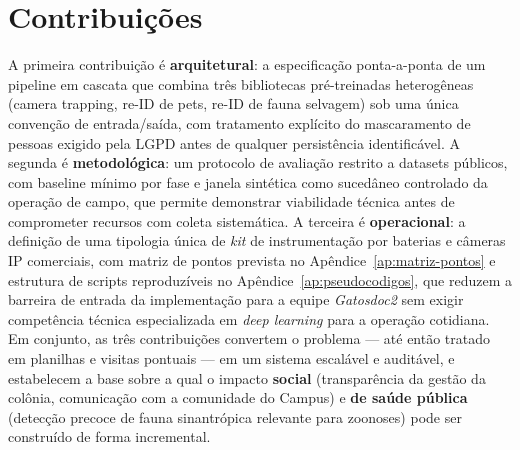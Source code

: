 \section{Contribuições}
\label{sec:conclusao-contribuicoes}

A primeira contribuição é \textbf{arquitetural}: a especificação ponta-a-ponta de um pipeline em cascata que combina três bibliotecas pré-treinadas heterogêneas (camera trapping, re-ID de pets, re-ID de fauna selvagem) sob uma única convenção de entrada/saída, com tratamento explícito do mascaramento de pessoas exigido pela LGPD antes de qualquer persistência identificável. A segunda é \textbf{metodológica}: um protocolo de avaliação restrito a datasets públicos, com baseline mínimo por fase e janela sintética como sucedâneo controlado da operação de campo, que permite demonstrar viabilidade técnica antes de comprometer recursos com coleta sistemática. A terceira é \textbf{operacional}: a definição de uma tipologia única de \emph{kit} de instrumentação por baterias e câmeras IP comerciais, com matriz de pontos prevista no Apêndice~\ref{ap:matriz-pontos} e estrutura de scripts reproduzíveis no Apêndice~\ref{ap:pseudocodigos}, que reduzem a barreira de entrada da implementação para a equipe \emph{Gatosdoc2} sem exigir competência técnica especializada em \emph{deep learning} para a operação cotidiana. Em conjunto, as três contribuições convertem o problema --- até então tratado em planilhas e visitas pontuais --- em um sistema escalável e auditável, e estabelecem a base sobre a qual o impacto \textbf{social} (transparência da gestão da colônia, comunicação com a comunidade do Campus) e \textbf{de saúde pública} (detecção precoce de fauna sinantrópica relevante para zoonoses) pode ser construído de forma incremental.
